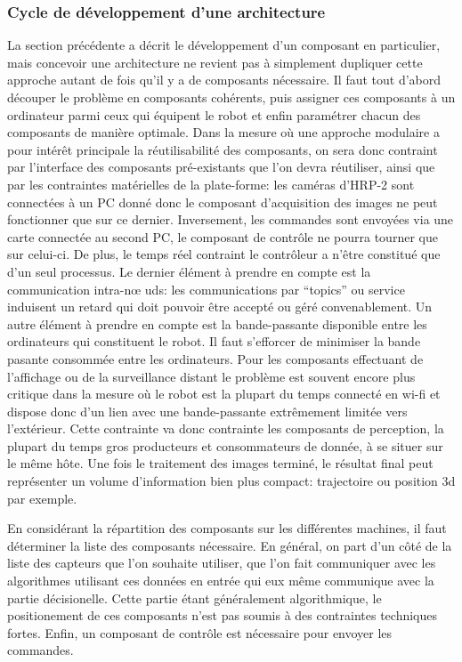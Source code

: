 \subsubsection{Cycle de développement d'une architecture}


La section précédente a décrit le développement d'un composant en
particulier, mais concevoir une architecture ne revient pas à
simplement dupliquer cette approche autant de fois qu'il y a de
composants nécessaire. Il faut tout d'abord découper le problème en
composants cohérents, puis assigner ces composants à un ordinateur
parmi ceux qui équipent le robot et enfin paramétrer chacun des
composants de manière optimale. Dans la mesure où une approche
modulaire a pour intérêt principale la réutilisabilité des
composants, on sera donc contraint par l'interface des composants
pré-existants que l'on devra réutiliser, ainsi que par les contraintes
matérielles de la plate-forme: les caméras d'HRP-2 sont connectées à
un PC donné donc le composant d'acquisition des images ne peut
fonctionner que sur ce dernier. Inversement, les commandes sont
envoyées via une carte connectée au second PC, le composant de
contrôle ne pourra tourner que sur celui-ci. De plus, le temps réel
contraint le contrôleur a n'être constitué que d'un seul processus. Le
dernier élément à prendre en compte est la communication intra-n\oe
uds: les communications par ``topics'' ou service induisent un retard
qui doit pouvoir être accepté ou géré convenablement. Un autre élément
à prendre en compte est la bande-passante disponible entre les
ordinateurs qui constituent le robot. Il faut s'efforcer de minimiser
la bande pasante consommée entre les ordinateurs. Pour les composants
effectuant de l'affichage ou de la surveillance distant le problème
est souvent encore plus critique dans la mesure où le robot est la
plupart du temps connecté en wi-fi et dispose donc d'un lien avec une
bande-passante extrêmement limitée vers l'extérieur. Cette contrainte
va donc contrainte les composants de perception, la plupart du temps
gros producteurs et consommateurs de donnée, à se situer sur le même
hôte. Une fois le traitement des images terminé, le résultat final
peut représenter un volume d'information bien plus compact:
trajectoire ou position 3d par exemple.


En considérant la répartition des composants sur les différentes
machines, il faut déterminer la liste des composants nécessaire. En
général, on part d'un côté de la liste des capteurs que l'on souhaite
utiliser, que l'on fait communiquer avec les algorithmes utilisant ces
données en entrée qui eux même communique avec la partie
décisionelle. Cette partie étant généralement algorithmique, le
positionement de ces composants n'est pas soumis à des contraintes
techniques fortes. Enfin, un composant de contrôle est nécessaire pour
envoyer les commandes.


